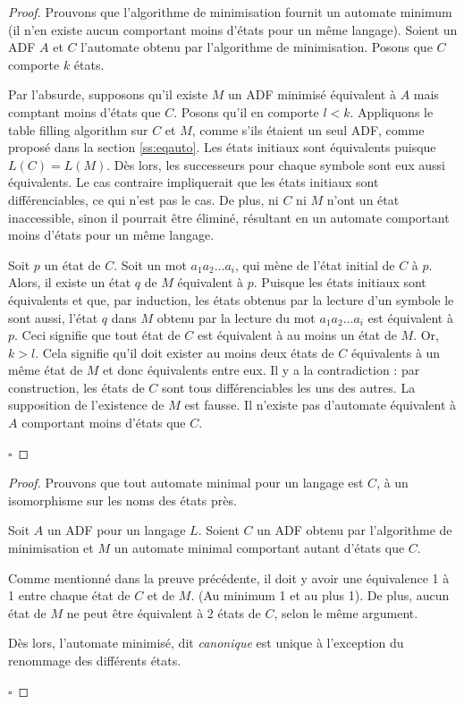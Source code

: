 \begin{proof}
 Prouvons que l'algorithme de minimisation fournit un automate minimum (il n'en existe aucun comportant moins d'états pour un même langage). Soient un ADF $A$ et $C$ l'automate obtenu par l'algorithme de minimisation. Posons que $C$ comporte $k$ états.

 Par l'absurde, supposons qu'il existe $M$ un ADF minimisé équivalent à $A$ mais comptant moins d'états que $C$. Posons qu'il en comporte $l<k$.
 Appliquons le table filling algorithm sur $C$ et $M$, comme s'ils étaient un seul ADF, comme proposé dans la section \ref{ss:eqauto}. Les états initiaux sont équivalents puisque $L(C)=L(M)$. Dès lors, les successeurs pour chaque symbole sont eux aussi équivalents. Le cas contraire impliquerait que les états initiaux sont différenciables, ce qui n'est pas le cas.
 De plus, ni $C$ ni $M$ n'ont un état inaccessible, sinon il pourrait être éliminé, résultant en un automate comportant moins d'états pour un même langage.

 Soit $p$ un état de $C$. Soit un mot $a_1a_2\dots a_i$, qui mène de l'état initial de $C$ à $p$. Alors, il existe un état $q$ de $M$ équivalent à $p$. Puisque les états initiaux sont équivalents et que, par induction, les états obtenus par la lecture d'un symbole le sont aussi, l'état $q$ dans $M$ obtenu par la lecture du mot $a_1a_2\dots a_i$ est équivalent à $p$. Ceci signifie que tout état de $C$ est équivalent à au moins un état de $M$.
 Or, $k>l$. Cela signifie qu'il doit exister au moins deux états de $C$ équivalents à un même état de $M$ et donc équivalents entre eux. Il y a la contradiction : par construction, les états de $C$ sont tous différenciables les uns des autres. La supposition de l'existence de $M$ est fausse. Il n'existe pas d'automate équivalent à $A$ comportant moins d'états que $C$.

 \hfill$\square$
\end{proof}

\begin{proof}
 Prouvons que tout automate minimal pour un langage est $C$, à un isomorphisme sur les noms des états près.

 Soit $A$ un ADF pour un langage $L$. Soient $C$ un ADF obtenu par l'algorithme de minimisation et $M$ un automate minimal comportant autant d'états que $C$.

 Comme mentionné dans la preuve précédente, il doit y avoir une équivalence 1 à 1 entre chaque état de $C$ et de $M$. (Au minimum 1 et au plus 1). De plus, aucun état de $M$ ne peut être équivalent à 2 états de $C$, selon le même argument.

 Dès lors, l'automate minimisé, dit \emph{canonique} est unique à l'exception du renommage des différents états.

 \hfill$\square$
\end{proof}
